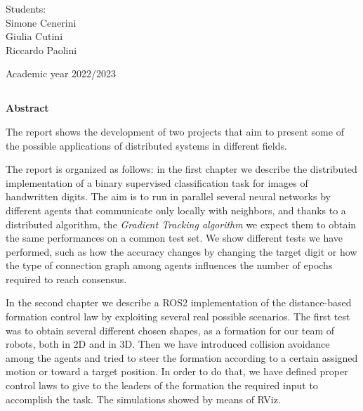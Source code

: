 \documentclass[a4paper,11pt,oneside]{book}
\begin{document}
\begin{flushright}
      {\large Students:}\\
      {Simone Cenerini} \\
      {Giulia Cutini} \\
      {Riccardo Paolini} \\
\end{flushright}        %
\begin{center}
\vfill
      {\large Academic year \@2022/2023} \\
\end{center}



\newpage
\thispagestyle{empty}

\begin{center}
\chapter*{}
\thispagestyle{empty}
{\Huge \textbf{Abstract}}\\
\vspace{15mm}
\end{center}

The report shows the development of two projects that aim to present some of the possible applications of distributed systems in different fields.

\bigskip
The report is organized as follows: in the first chapter we describe the distributed implementation of a binary supervised classification task for images of handwritten digits. The aim is to run in parallel several neural networks by different agents that communicate only locally with neighbors, and thanks to a distributed algorithm, the \textit{Gradient Tracking algorithm} we expect them to obtain the same performances on a common test set. We show different tests we have performed, such as how the accuracy changes by changing the target digit or how the type of connection graph among agents influences the number of epochs required to reach consensus.

\bigskip
In the second chapter we describe a ROS2 implementation of the distance-based formation control law by exploiting several real possible scenarios. The first test was to obtain several different chosen shapes, as a formation for our team of robots, both in 2D and in 3D. 
Then we have introduced collision avoidance among the agents and tried to steer the formation according to a certain assigned motion or toward a target position. In order to do that, we have defined proper control laws to give to the leaders of the formation the required input to accomplish the task.
The simulations showed by means of RViz.
\end{document}
